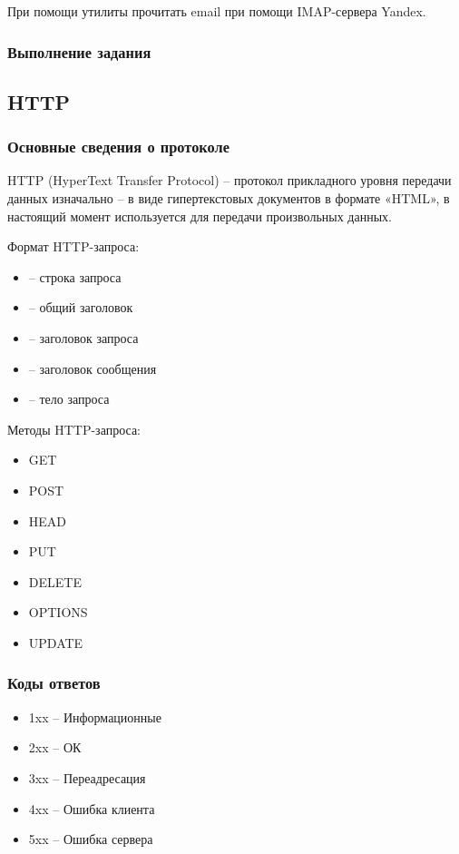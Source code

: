 При помощи утилиты  прочитать email при помощи IMAP-сервера Yandex.

\subsubsection{Выполнение задания}



\subsection{HTTP}

\subsubsection{Основные сведения о протоколе}

HTTP (HyperText Transfer Protocol) -- протокол прикладного уровня передачи данных изначально -- в виде гипертекстовых документов в формате «HTML», в настоящий момент используется для передачи произвольных данных. 

Формат HTTP-запроса:

\begin{itemize}
	\item {} -- строка запроса
	\item {} -- общий заголовок
	\item {} -- заголовок запроса
	\item {} -- заголовок сообщения
	\item {} -- тело запроса
\end{itemize}

Методы HTTP-запроса:

\begin{itemize}
	\item GET
	\item POST
	\item HEAD
	\item PUT
	\item DELETE
	\item OPTIONS
	\item UPDATE
\end{itemize}

\subsubsection{Коды ответов}
\begin{itemize}
	\item 1xx -- Информационные
	\item 2xx -- ОК
	\item 3xx -- Переадресация
	\item 4xx -- Ошибка клиента
	\item 5xx -- Ошибка сервера
\end{itemize}

